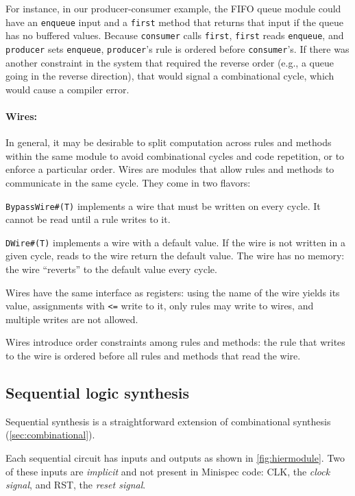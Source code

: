 For instance, in our producer-consumer example, the FIFO queue module could have an
\texttt{enqueue} input and a \texttt{first} method that returns that input if the queue has no buffered values.
Because \texttt{consumer} calls \texttt{first}, \texttt{first} reads \texttt{enqueue}, and \texttt{producer}
sets \texttt{enqueue}, \texttt{producer}'s rule is ordered before \texttt{consumer}'s.
If there was another constraint in the system that required the reverse order
(e.g., a queue going in the reverse direction), that would signal a combinational cycle,
which would cause a compiler error.

\paragraph{Wires:}
In general, it may be desirable to split computation across rules and methods
within the same module to avoid combinational cycles and code repetition, or to enforce a particular order.
Wires are modules that allow rules and methods to communicate in the same cycle.
They come in two flavors:
\begin{compactitem}
\item \verb|BypassWire#(T)| implements a wire that must be written on every cycle. It cannot be read until a rule writes to it.
\item \verb|DWire#(T)| implements a wire with a default value. If the wire is not written in a given cycle,
  reads to the wire return the default value. The wire has no memory: the wire ``reverts'' to the default value every cycle.
\end{compactitem}
Wires have the same interface as registers: using the name of the wire yields its value,
assignments with \verb|<=| write to it, only rules may write to wires, and multiple writes are not allowed.

Wires introduce order constraints among rules and methods:
the rule that writes to the wire is ordered before all rules and methods that read the wire.

\subsection{Sequential logic synthesis}
\label{sec:sequential}

Sequential synthesis is a straightforward extension of combinational synthesis (\autoref{sec:combinational}).

Each sequential circuit has inputs and outputs as shown in \autoref{fig:hiermodule}.
Two of these inputs are \emph{implicit} and not present in Minispec code:
CLK, the \emph{clock signal}, and RST, the \emph{reset signal}.

